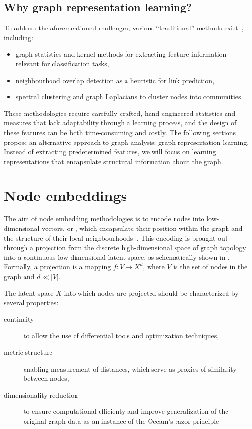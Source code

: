 \subsection{Why graph representation learning?}
To address the aforementioned challenges, various ``traditional'' methods exist~\cite{Hamilton2020GraphRL}, including:
\begin{itemize}
    \item graph statistics and kernel methods for extracting feature information relevant for classification tasks,
    \item neighbourhood overlap detection as a heuristic for link prediction,
    \item spectral clustering and graph Laplacians to cluster nodes into communities.
\end{itemize}

These methodologies require carefully crafted, hand-engineered statistics and measures that lack adaptability through a learning process, and the design of these features can be both time-consuming and costly. The following sections propose an alternative approach to graph analysis: graph representation learning. Instead of extracting predetermined features, we will focus on learning representations that encapsulate structural information about the graph.

\section{Node embeddings}\label{sec:shallowEmbeddings}
The aim of node embedding methodologies is to encode nodes into low-dimensional vectors, or , which encapsulate their position within the graph and the structure of their local neighbourhoods~\cite{Hoff2002latentSpaceApproachesSocialNetworkAnalysis}. This encoding is brought out through a projection from the discrete high-dimensional space of graph topology into a continuous low-dimensional latent space, as schematically shown in . Formally, a projection is a mapping $f:V\to X^d$, where $V$ is the set of nodes in the graph and $d \ll |V|$. 

The latent space $X$ into which nodes are projected should be characterized by several properties:
\begin{description}
    \item[continuity] to allow the use of differential tools and optimization techniques,
    \item[metric structure] enabling measurement of distances, which serve as proxies of similarity between nodes,
    \item[dimensionality reduction] to ensure computational efficienty and improve generalization of the original graph data as an instance of the Occam's razor principle
\end{description}

